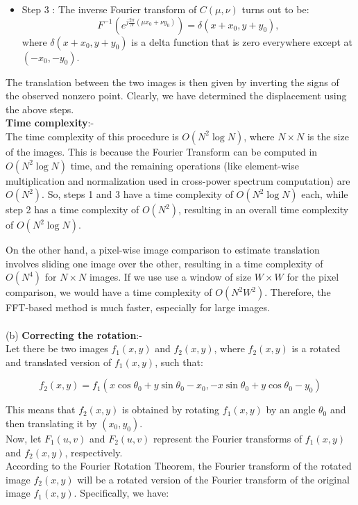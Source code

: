 \documentclass{article}
\begin{document}
\begin{enumerate}
\begin{itemize}
    \item Step 3 : The inverse Fourier transform of \( C(\mu, \nu) \) turns out to be:
    \[
    F^{-1} \left( e^{j \frac{2 \pi}{N} (\mu x_0 + \nu y_0)} \right) = \delta(x + x_0, y + y_0),
    \]
    where \( \delta(x + x_0, y + y_0) \) is a delta function that is zero everywhere except at \( (-x_0, -y_0) \).
\end{itemize}

The translation between the two images is then given by inverting the signs of the observed nonzero point.  Clearly, we have determined the displacement using the above steps.
\\
\textbf{Time complexity}:-\\
The time complexity of this procedure is \( O(N^2 \log N) \), where \( N \times N \) is the size of the images. This is because the Fourier Transform can be computed in \( O(N^2 \log N) \) time, and the remaining operations (like element-wise multiplication and normalization used in cross-power spectrum computation) are \( O(N^2) \). So, steps 1 and 3 have a time complexity of \( O(N^2 \log N) \) each, while step 2 has a time complexity of \( O(N^2) \), resulting in an overall time complexity of \( O(N^2 \log N) \).

On the other hand, a pixel-wise image comparison to estimate translation involves sliding one image over the other, resulting in a time complexity of \( O(N^4) \) for \( N \times N \) images. If we use use a window of size \( W \times W \) for the pixel comparison, we would have a time complexity of \( O(N^2W^2) \). Therefore, the FFT-based method is much faster, especially for large images.
\\\\
(b) \textbf{Correcting the rotation}:-\\
Let there be two images \( f_1(x, y) \) and \( f_2(x, y) \), where \( f_2(x, y) \) is a rotated and translated version of \( f_1(x, y) \), such that:

\[
f_2(x, y) = f_1(x \cos \theta_0 + y \sin \theta_0 - x_0, -x \sin \theta_0 + y \cos \theta_0 - y_0)
\]

This means that \( f_2(x, y) \) is obtained by rotating \( f_1(x, y) \) by an angle \( \theta_0 \) and then translating it by \( (x_0, y_0) \). \\
Now, let \( F_1(u, v) \) and \( F_2(u, v) \) represent the Fourier transforms of \( f_1(x, y) \) and \( f_2(x, y) \), respectively.
\\
According to the Fourier Rotation Theorem, the Fourier transform of the rotated image \( f_2(x, y) \) will be a rotated version of the Fourier transform of the original image \( f_1(x, y) \). Specifically, we have:


\end{enumerate}
\end{document}

